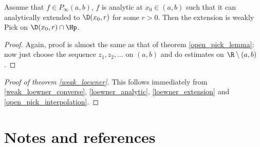\begin{lem}\label{loewner_extension}
	Assume that $f \in P_{\infty}(a, b)$, $f$ is analytic at $x_{0} \in (a, b)$ such that it can analytically extended to $\D(x_{0}, r)$ for some $r > 0$. Then the extension is weakly Pick on $\D(x_{0}, r) \cap \Hp$.
\end{lem}
\begin{proof}
	Again, proof is almost the same as that of theorem \ref{open_pick_lemma}: now just choose the sequence $z_{1}, z_{2}, \ldots$ on $(a, b)$ and do estimates on $\R \setminus (a, b)$.
\end{proof}

\begin{proof}[Proof of theorem \ref{weak_loewner}]
	This follows immediately from \ref{weak_loewner_converse}, \ref{loewner_analytic}, \ref{loewner_extension} and \ref{open_pick_interpolation}.
\end{proof}

\section{Notes and references}


